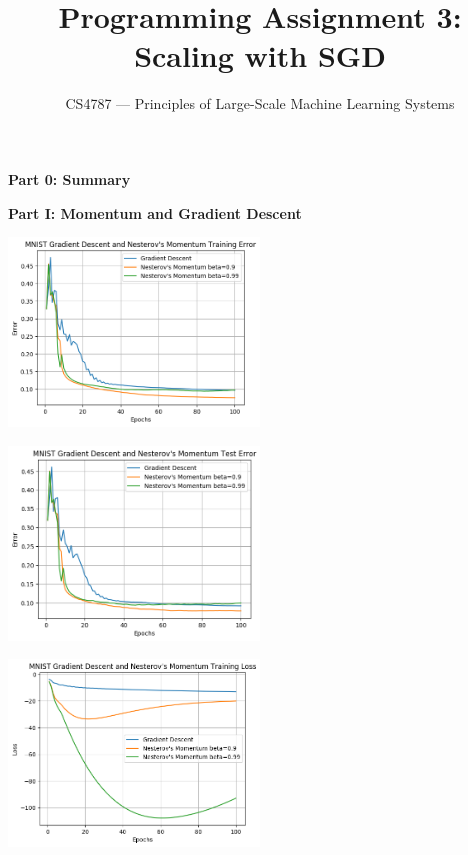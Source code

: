 \documentclass[10pt]{article}
\begin{document}
\nobibliography*

\title{Programming Assignment 3: Scaling with SGD}
\author{CS4787 --- Principles of Large-Scale Machine Learning Systems}
\date{}

\maketitle
\textbf{Part 0: Summary}

\textbf{Part I: Momentum and Gradient Descent}

\begin{center}
    \includegraphics[width=0.5\textwidth]{GradientDescentandNesterov'sMomentumTrainingError.png}
\end{center}
\begin{center}
    \includegraphics[width=0.5\textwidth]{GradientDescentandNesterov'sMomentumTestError.png}
\end{center}
\begin{center}
    \includegraphics[width=0.5\textwidth]{GradientDescentandNesterov'sMomentumTrainingLoss.png}
\end{center}
\end{document}
